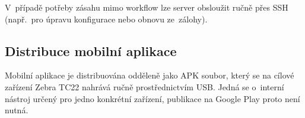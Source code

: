V~případě potřeby zásahu mimo workflow lze server obsloužit ručně přes SSH (např.\ pro úpravu konfigurace nebo obnovu ze~zálohy).

\subsection{Distribuce mobilní aplikace}

Mobilní aplikace je distribuována odděleně jako APK soubor, který se na cílové zařízení Zebra TC22 nahrává ručně prostřednictvím USB. Jedná se o~interní nástroj určený pro jedno konkrétní zařízení, publikace na Google Play proto není nutná.


